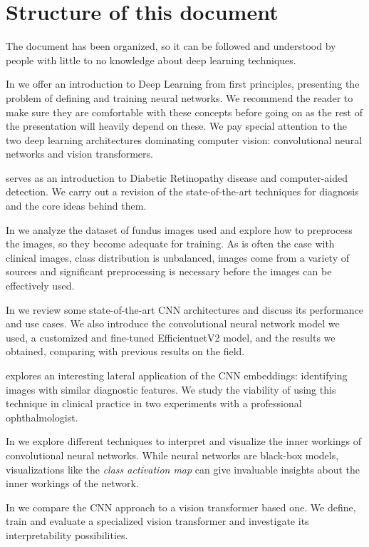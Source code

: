 \section{Structure of this document}
The document has been organized, so it can be followed and understood by people with little to no knowledge about deep learning techniques. 

In  we offer an introduction to Deep Learning from first principles, presenting the problem of defining and training neural networks. We recommend the reader to make sure they are comfortable with these concepts before going on as the rest of the presentation will heavily depend on these. We pay special attention to the two deep learning architectures dominating computer vision: convolutional neural networks and vision transformers.

 serves as an introduction to Diabetic Retinopathy disease and computer-aided detection. We carry out a revision of the state-of-the-art techniques for diagnosis and the core ideas behind them.

In  we analyze the dataset of fundus images used and explore how to preprocess the images, so they become adequate for training. As is often the case with clinical images, class distribution is unbalanced, images come from a variety of sources and significant preprocessing is necessary before the images can be effectively used.

In  we review some state-of-the-art CNN architectures and discuss its performance and use cases. We also introduce the convolutional neural network model we used, a customized and fine-tuned EfficientnetV2 model, and the results we obtained, comparing with previous results on the field. 

 explores an interesting lateral application of the CNN embeddings: identifying images with similar diagnostic features. We study the viability of using this technique in clinical practice in two experiments with a professional ophthalmologist.

In  we explore different techniques to interpret and visualize the inner workings of convolutional neural networks. While neural networks are black-box models, visualizations like the \textit{class activation map} can give invaluable insights about the inner workings of the network.

In  we compare the CNN approach to a vision transformer based one. We define, train and evaluate a specialized vision transformer and investigate its interpretability possibilities. 

